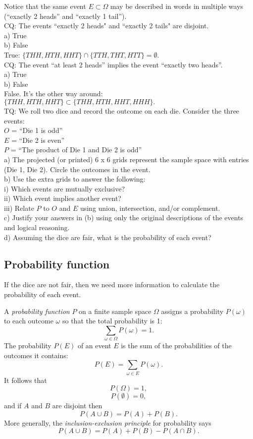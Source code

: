 \documentclass[12pt]{article}
\begin{document}
Notice that the same event $E \subset \Omega$ may be described in words in multiple ways (``exactly 2 heads'' and ``exactly 1 tail'').\\

CQ: The events ``exactly 2 heads" and ``exactly 2 tails" are disjoint. \\
a) True \\
b) False \\
True: $\{THH, HTH, HHT\} \cap \{TTH, THT, HTT\} = \emptyset.$ \\

CQ: The event ``at least 2 heads'' implies the event ``exactly two heads''. \\
a) True \\
b) False \\
False.  It's the other way around: $\{THH, HTH, HHT\} \subset \{THH, HTH, HHT, HHH\}.$  \\

TQ: We roll two dice and record the outcome on each die.  Consider the three events: \\
$O$ = ``Die 1 is odd'' \\
$E$ = ``Die 2 is even'' \\
$P$ = ``The product of Die 1 and Die 2 is odd'' \\
a) The projected (or printed) 6 x 6 grids represent the sample space with entries (Die 1, Die 2).  Circle the outcomes in the event. \\
b) Use the extra grids to answer the following:\\
i) Which events are mutually exclusive?\\
ii) Which event implies another event?\\
iii) Relate $P$ to $O$ and $E$ using union, intersection, and/or complement.\\
c) Justify your answers in (b) using only the original descriptions of the events and logical reasoning. \\
d) Assuming the dice are fair, what is the probability of each event?

\subsection{Probability function}

If the dice are not fair, then we need more information to calculate the probability of each event.

A {\em probability function} $P$ on a finite sample space $\Omega$ assigns a probability $P(\omega)$ to each outcome $\omega$ so that the total probability is 1:
$$\sum_{\omega\in\Omega} P(\omega) = 1.$$
The probability $P(E)$ of an event $E$ is the sum of the probabilities of the outcomes it contains:
$$P(E) = \sum_{\omega \in E} P(\omega).$$
It follows that $$P(\Omega) = 1,$$ $$P(\emptyset) = 0,$$ and if $A$ and $B$ are disjoint then $$P(A \cup B) = P(A) + P(B).$$
More generally, the {\em inclusion-exclusion principle} for probability says
$$P(A \cup B) = P(A) + P(B) - P(A \cap B).$$
\end{document}
